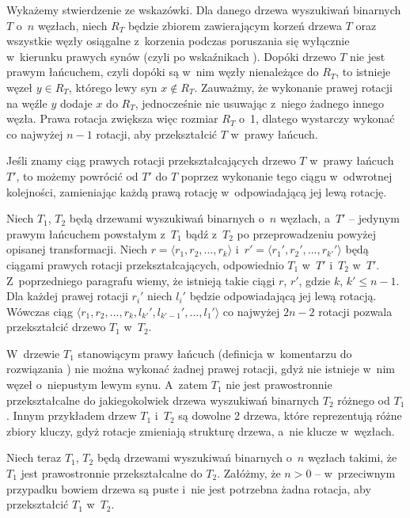 \noindent Wykażemy stwierdzenie ze wskazówki.
Dla danego drzewa wyszukiwań binarnych $T$ o~$n$ węzłach, niech $R_T$ będzie zbiorem zawierającym korzeń drzewa $T$ oraz wszystkie węzły osiągalne z~korzenia podczas poruszania się wyłącznie w~kierunku prawych synów (czyli po wskaźnikach ).
Dopóki drzewo $T$ nie jest prawym łańcuchem, czyli dopóki są w~nim węzły nienależące do $R_T$, to istnieje węzeł $y\in R_T$, którego lewy syn $x\not\in R_T$.
Zauważmy, że wykonanie prawej rotacji na węźle $y$ dodaje $x$ do $R_T$, jednocześnie nie usuwając z~niego żadnego innego węzła.
Prawa rotacja zwiększa więc rozmiar $R_T$ o~1, dlatego wystarczy wykonać co najwyżej $n-1$ rotacji, aby przekształcić $T$ w~prawy łańcuch.

Jeśli znamy ciąg prawych rotacji przekształcających drzewo $T$ w~prawy łańcuch $T'$, to możemy powrócić od $T'$ do $T$ poprzez wykonanie tego ciągu w~odwrotnej kolejności, zamieniając każdą prawą rotację w~odpowiadającą jej lewą rotację.

Niech $T_1$, $T_2$ będą drzewami wyszukiwań binarnych o~$n$ węzłach, a~$T'$ -- jedynym prawym łańcuchem powstałym z~$T_1$ bądź z~$T_2$ po przeprowadzeniu powyżej opisanej transformacji.
Niech $r=\langle r_1,r_2,\dots,r_k\rangle$ i~$r'=\langle r_1',r_2',\dots,r_{k'}'\rangle$ będą ciągami prawych rotacji przekształcających, odpowiednio $T_1$ w~$T'$ i~$T_2$ w~$T'$.
Z~poprzedniego paragrafu wiemy, że istnieją takie ciągi $r$, $r'$, gdzie $k$, $k'\le n-1$.
Dla każdej prawej rotacji $r_i'$ niech $l_i'$ będzie odpowiadającą jej lewą rotacją.
Wówczas ciąg $\langle r_1,r_2,\dots,r_k,l_{k'}',l_{k'-1}',\dots,l_1'\rangle$ co najwyżej $2n-2$ rotacji pozwala przekształcić drzewo $T_1$ w~$T_2$.

\exercise %

\noindent W~drzewie $T_1$ stanowiącym prawy łańcuch (definicja w~komentarzu do rozwiązania ) nie można wykonać żadnej prawej rotacji, gdyż nie istnieje w~nim węzeł o~niepustym lewym synu.
A~zatem $T_1$ nie jest prawostronnie przekształcalne do jakiegokolwiek drzewa wyszukiwań binarnych $T_2$ różnego od $T_1$.
Innym przykładem drzew $T_1$ i~$T_2$ są dowolne 2 drzewa, które reprezentują różne zbiory kluczy, gdyż rotacje zmieniają strukturę drzewa, a~nie klucze w~węzłach.

Niech teraz $T_1$, $T_2$ będą drzewami wyszukiwań binarnych o~$n$ węzłach takimi, że $T_1$ jest prawostronnie przekształcalne do $T_2$.
Załóżmy, że $n>0$ -- w~przeciwnym przypadku bowiem drzewa są puste i~nie jest potrzebna żadna rotacja, aby przekształcić $T_1$ w~$T_2$.

